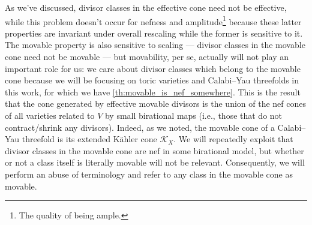 \documentclass[11pt,dvipsnames]{article}
\theoremstyle{definition}
\begin{document}
As we've discussed, divisor classes in the effective cone need not be effective, while this problem doesn't occur for nefness and amplitude\footnote{The quality of being ample.} because these latter properties are invariant under overall rescaling while the former is sensitive to it. The movable property is also sensitive to scaling --- divisor classes in the movable cone need not be movable --- but movability, per se, actually will not play an important role for us: we care about divisor classes which belong to the movable cone because we will be focusing on toric varieties and Calabi--Yau threefolds in this work, for which we have \cref{th:movable_is_nef_somewhere}. This is the result that the cone generated by effective movable divisors is the union of the nef cones of all varieties related to $V$ by small birational maps (i.e., those that do not contract/shrink any divisors). Indeed, as we noted, the movable cone of a Calabi--Yau threefold is its extended K\"ahler cone $\mathcal{K}_X$. We will repeatedly exploit that divisor classes in the movable cone are nef in some birational model, but whether or not a class itself is literally movable will not be relevant. Consequently, we will perform an abuse of terminology and refer to any class in the movable cone as movable. 
\end{document}
